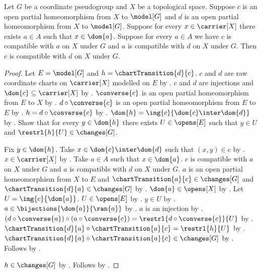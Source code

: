 \begin{theorem}\label{coordinate_compatibility_from_cover}
    Let $G$ be a coordinate pseudogroup and $X$ be a topological space.
    Suppose $c$ is an open partial homeomorphism from $X$ to $\model[G]$ and
        $d$ is an open partial homeomorphism from $X$ to $\model[G]$.
    Suppose for every $x\in\carrier[X]$ there exists $a\in A$ such that $x\in\dom{a}$.
    Suppose for every $a\in A$ we have $c$ is compatible with $a$ on $X$ under $G$
        and $a$ is compatible with $d$ on $X$ under $G$.
    Then $c$ is compatible with $d$ on $X$ under $G$.
\end{theorem}
\begin{proof}
    Let $E=\model[G]$ and $h=\chartTransition{d}{c}$.
    $c$ and $d$ are raw coordinate charts on $\carrier[X]$ modelled on $E$ by
        .
    $c$ and $d$ are injections and $\dom{c}\subseteq\carrier[X]$ by
        .
    $\converse{c}$ is an open partial homeomorphism from $E$ to $X$ by
        .
    $d\circ\converse{c}$ is an open partial homeomorphism from $E$ to $E$ by
        .
    $h=d\circ\converse{c}$ by .
    $\dom{h}=\img{c}{\dom{c}\inter\dom{d}}$ by .
    Show that for every $y\in\dom{h}$ there exists $U\in\opens[E]$ such that
        $y\in U$ and $\restrl{h}{U}\in\changes[G]$.
    \begin{subproof}
        Fix $y\in\dom{h}$.
        Take $x\in\dom{c}\inter\dom{d}$ such that $(x,y)\in c$ by .
        $x\in\carrier[X]$ by .
        Take $a\in A$ such that $x\in\dom{a}$.
        $c$ is compatible with $a$ on $X$ under $G$ and
            $a$ is compatible with $d$ on $X$ under $G$.
        $a$ is an open partial homeomorphism from $X$ to $E$ and
            $\chartTransition{a}{c}\in\changes[G]$ and
            $\chartTransition{d}{a}\in\changes[G]$ by
            .
        $\dom{a}\in\opens[X]$ by .
        Let $U=\img{c}{\dom{a}}$.
        $U\in\opens[E]$ by .
        $y\in U$ by .
        $a\in\bijections{\dom{a}}{\ran{a}}$ by
            .
        $a$ is an injection by .
        $(d\circ\converse{a})\circ(a\circ\converse{c})
            =\restrl{d\circ\converse{c}}{U}$ by .
        $\chartTransition{d}{a}\circ\chartTransition{a}{c}
            =\restrl{h}{U}$ by .
        $\chartTransition{d}{a}\circ\chartTransition{a}{c}\in\changes[G]$ by
            .
        Follows by \auto.
    \end{subproof}
    $h\in\changes[G]$ by .
    Follows by .
\end{proof}

